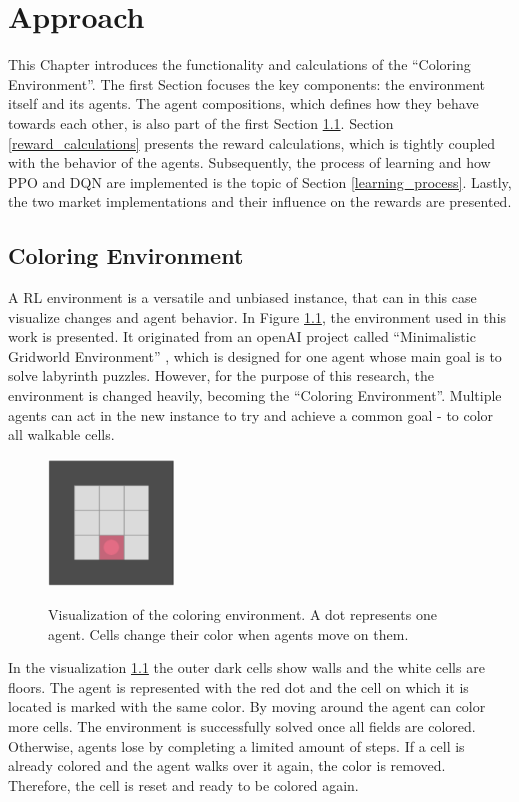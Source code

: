\chapter{Approach}\label{sec:Approach}
This Chapter introduces the functionality and calculations of the ``Coloring Environment''. The first Section focuses the key components: the environment itself and its agents. The agent compositions, which defines how they behave towards each other, is also part of the first Section \ref{env}. Section \ref{reward_calculations} presents the reward calculations, which is tightly coupled with the behavior of the agents. Subsequently, the process of learning and how PPO and DQN are implemented is the topic of Section \ref{learning_process}. Lastly, the two market implementations and their influence on the rewards are presented.

\section{Coloring Environment}\label{env}
A RL environment is a versatile and unbiased instance, that can in this case visualize changes and agent behavior. In Figure \ref{fig:env}, the environment used in this work is presented. It originated from an openAI project called ``Minimalistic Gridworld Environment'' \cite{chwi18}, which is designed for one agent whose main goal is to solve labyrinth puzzles. However, for the purpose of this research, the environment is changed heavily, becoming the ``Coloring Environment''. Multiple agents can act in the new instance to try and achieve a common goal - to color all walkable cells.

\begin{figure}[hpbt]
    \centering
    \includegraphics[width=0.3\textwidth]{pictures/Gridworld}\\
    \caption[Coloring Environment]{Visualization of the coloring environment. A dot represents one agent. Cells change their color when agents move on them.}\label{fig:env}
\end{figure}

In the visualization \ref{fig:env} the outer dark cells show walls and the white cells are floors. The agent is represented with the red dot and the cell on which it is located is marked with the same color. By moving around the agent can color more cells. The environment is successfully solved once all fields are colored. Otherwise, agents lose by completing a limited amount of steps. If a cell is already colored and the agent walks over it again, the color is removed. Therefore, the cell is reset and ready to be colored again. 

